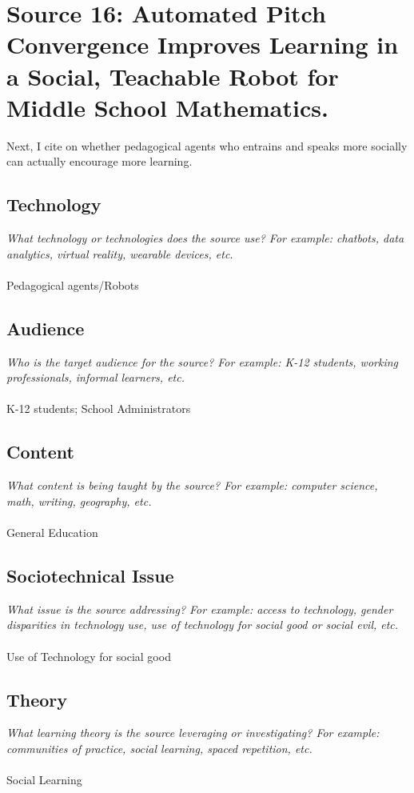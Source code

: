 \documentclass[12pt, final]{article}
\begin{document}
\section{Source 16: Automated Pitch Convergence Improves Learning in a Social, Teachable Robot for Middle School Mathematics.}
\label{Source 16}

Next, I cite \cite{Lubold} on whether pedagogical agents who entrains and speaks more socially can actually encourage more learning.

\subsection{Technology}
\textit{What technology or technologies does the source use? For example: chatbots, data analytics, virtual reality, wearable devices, etc.}
\\
\\
Pedagogical agents/Robots

\subsection{Audience}
\textit{Who is the target audience for the source? For example: K-12 students, working professionals, informal learners, etc.}
\\
\\
K-12 students; School Administrators

\subsection{Content}
\textit{What content is being taught by the source? For example: computer science, math, writing, geography, etc.}
\\
\\
General Education

\subsection{Sociotechnical Issue}
\textit{What issue is the source addressing? For example: access to technology, gender disparities in technology use, use of technology for social good or social evil, etc.}
\\
\\
Use of Technology for social good

\subsection{Theory}
\textit{What learning theory is the source leveraging or investigating? For example: communities of practice, social learning, spaced repetition, etc.}
\\
\\
Social Learning
\end{document}
